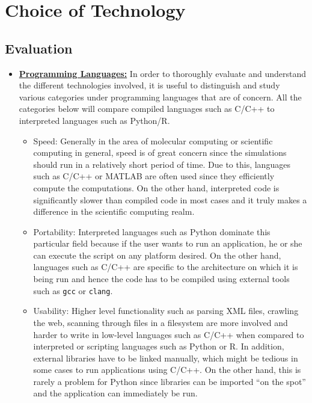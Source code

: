 \section*{Choice of Technology}

\subsection*{Evaluation}

\begin{itemize}
    \item \textbf{\underline{Programming Languages:}} In order to thoroughly evaluate and understand the different technologies involved, it is useful to distinguish and study various categories under programming languages that are of concern. All the categories below will compare compiled languages such as C/C++ to interpreted languages such as Python/R. 
    
    \begin{itemize}
        \item Speed: Generally in the area of molecular computing or scientific computing in general, speed is of great concern since the simulations should run in a relatively short period of time. Due to this, languages such as C/C++ or MATLAB are often used since they efficiently compute the computations. On the other hand, interpreted code is significantly slower than compiled code in most cases and it truly makes a difference in the scientific computing realm.
        
        \item Portability: Interpreted languages such as Python dominate this particular field because if the user wants to run an application, he or she can execute the script on any platform desired. On the other hand, languages such as C/C++ are specific to the architecture on which it is being run and hence the code has to be compiled using external tools such as \verb|gcc| or \verb|clang|. 
        
        \item Usability: Higher level functionality such as parsing XML files, crawling the web, scanning through files in a filesystem are more involved and harder to write in low-level languages such as C/C++ when compared to interpreted or scripting languages such as Python or R.  In addition, external libraries have to be linked manually, which might be tedious in some cases to run applications using C/C++. On the other hand, this is rarely a problem for Python since libraries can be imported ``on the spot'' and the application can immediately be run.
        

\end{itemize}
\end{itemize}
